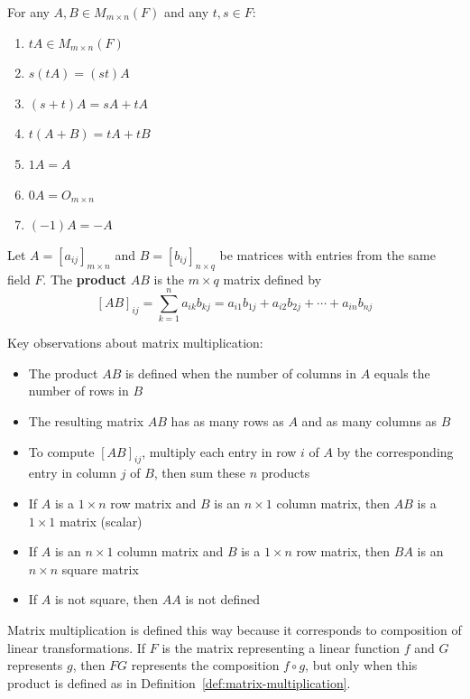 \begin{theorem}\label{thm:scalar-multiplication-properties}
    For any $A, B \in M_{m \times n}(F)$ and any $t, s \in F$:
    \begin{enumerate}[label=(\roman*)]
        \item $tA \in M_{m \times n}(F)$
        \item $s(tA) = (st)A$
        \item $(s + t)A = sA + tA$
        \item $t(A + B) = tA + tB$
        \item $1A = A$
        \item $0A = O_{m \times n}$
        \item $(-1)A = -A$
    \end{enumerate}
\end{theorem}

\begin{definition}\label{def:matrix-multiplication}
    Let $A = [a_{ij}]_{m \times n}$ and $B = [b_{ij}]_{n \times q}$ be matrices with entries from the same field $F$. The \textbf{product} $AB$ is the $m \times q$ matrix defined by
    \[
    [AB]_{ij} = \sum_{k=1}^{n} a_{ik}b_{kj} = a_{i1}b_{1j} + a_{i2}b_{2j} + \cdots + a_{in}b_{nj}
    \]
\end{definition}

\begin{note}
    Key observations about matrix multiplication:
    \begin{itemize}
        \item The product $AB$ is defined when the number of columns in $A$ equals the number of rows in $B$
        \item The resulting matrix $AB$ has as many rows as $A$ and as many columns as $B$
        \item To compute $[AB]_{ij}$, multiply each entry in row $i$ of $A$ by the corresponding entry in column $j$ of $B$, then sum these $n$ products
        \item If $A$ is a $1 \times n$ row matrix and $B$ is an $n \times 1$ column matrix, then $AB$ is a $1 \times 1$ matrix (scalar)
        \item If $A$ is an $n \times 1$ column matrix and $B$ is a $1 \times n$ row matrix, then $BA$ is an $n \times n$ square matrix
        \item If $A$ is not square, then $AA$ is not defined
    \end{itemize}
\end{note}


\begin{note}
    Matrix multiplication is defined this way because it corresponds to composition of linear transformations. If $F$ is the matrix representing a linear function $f$ and $G$ represents $g$, then $FG$ represents the composition $f \circ g$, but only when this product is defined as in Definition~\ref{def:matrix-multiplication}.
\end{note}